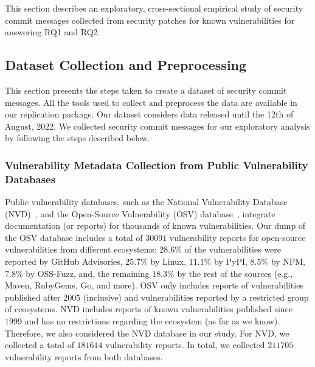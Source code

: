 This section describes an exploratory, cross-sectional empirical study of security commit messages collected from security patches for known vulnerabilities for answering RQ1 and RQ2. 


\subsection{Dataset Collection and Preprocessing} 

This section presents the steps taken to create a dataset of security commit messages.
All the tools used to collect and preprocess the data are available in our replication package. Our dataset considers data released until the 12th of August, 2022.
We collected security commit messages for our exploratory analysis by following the steps described below.

\subsubsection{Vulnerability Metadata Collection from Public Vulnerability Databases}
%
Public vulnerability databases, such as 
the National Vulnerability Database 
(NVD)~\cite{nvd}, and
the Open-Source Vulnerability (OSV) 
database~\cite{osv}, integrate documentation (or reports) for thousands of known vulnerabilities. Our dump of the OSV database includes a total of $30091$ vulnerability reports for open-source vulnerabilities from different ecosystems:
$28.6\%$ of the vulnerabilities were reported by GitHub Advisories, $25.7\%$ by  Linux, $11.1\%$ by PyPI,
$8.5\%$ by NPM, $7.8\%$ by OSS-Fuzz, and, the remaining $18.3\%$ by the rest of the
sources (e.g., Maven, RubyGems, Go,
and more). OSV only includes reports of vulnerabilities published after $2005$ (inclusive) 
and vulnerabilities reported by a restricted group of ecosystems. NVD includes reports of known vulnerabilities published since $1999$ and has no restrictions regarding the 
ecosystem (as far as we know). Therefore, we also considered the 
NVD database in our study. For NVD, we collected a total of $181614$ 
vulnerability reports. In total, we collected $211705$ vulnerability reports from both databases.


